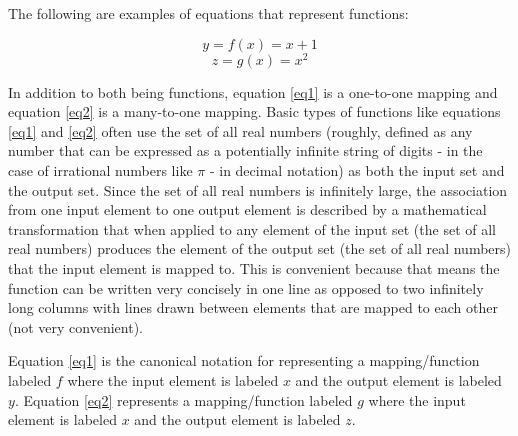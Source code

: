 The following are examples of equations that represent functions:

\begin{equation} \label{eq1}
y = f(x) = x + 1
\end{equation}
\begin{equation} \label{eq2}
z = g(x) = x^{2}
\end{equation}

In addition to both being functions, equation \ref{eq1} is a one-to-one mapping and equation \ref{eq2} is a many-to-one mapping. Basic types of functions like equations \ref{eq1} and \ref{eq2} often use the set of all real numbers (roughly, defined as any number that can be expressed as a potentially infinite string of digits - in the case of irrational numbers like \begin{math}\pi\end{math} - in decimal notation) as both the input set and the output set. Since the set of all real numbers is infinitely large, the association from one input element to one output element is described by a mathematical transformation that when applied to any element of the input set (the set of all real numbers) produces the element of the output set (the set of all real numbers) that the input element is mapped to. This is convenient because that means the function can be written very concisely in one line as opposed to two infinitely long columns with lines drawn between elements that are mapped to each other (not very convenient). 

Equation \ref{eq1} is the canonical notation for representing a mapping/function labeled \begin{math}f\end{math} where the input element is labeled \begin{math}x\end{math} and the output element is labeled \begin{math}y\end{math}. Equation \ref{eq2} represents a mapping/function labeled \begin{math}g\end{math} where the input element is labeled \begin{math}x\end{math} and the output element is labeled \begin{math}z\end{math}. 

